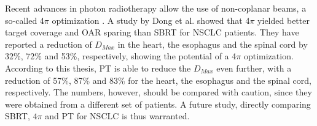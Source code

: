 Recent advances in photon radiotherapy allow the use of non-coplanar beams, a so-called 4$\pi$ optimization \cite{Dong2013}. A study by Dong et al. \cite{Dong2013b} showed that
4$\pi$ yielded better target coverage and OAR sparing than SBRT for NSCLC patients. 
They have reported a reduction of $D_{Max}$ in the heart, the esophagus and the spinal cord by 32\%, 72\% and 53\%, respectively, showing
the potential of a 4$\pi$ optimization. According to this thesis, PT is able to reduce the $D_{Max}$ even further, with a reduction of 57\%, 87\% and 83\% for the heart, the esophagus and the spinal cord,
respectively. The numbers, however, should be compared with caution, since they were obtained from a different set of patients. 
A future study, directly comparing SBRT, $4\pi$ and PT for NSCLC is thus warranted.






